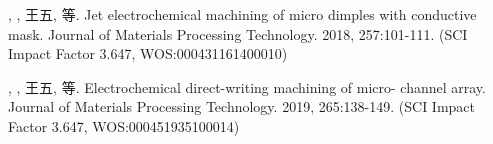 \documentclass[
  type=doctor
]{../gdutthesis}
\begin{document}
  \cite{zhangsan2018jet}

  \begin{results}
    \item {}, , 王五, 等. Jet electrochemical machining of micro dimples with conductive mask.
    Journal of Materials Processing Technology. 2018, 257:101-111. (SCI Impact Factor 3.647,
    WOS:000431161400010)
    \item {}, , 王五, 等. Electrochemical direct-writing machining of micro- channel array.
    Journal of Materials Processing Technology. 2019, 265:138-149. (SCI Impact Factor 3.647,
    WOS:000451935100014)
  \end{results}

  \printbibliography
\end{document}
